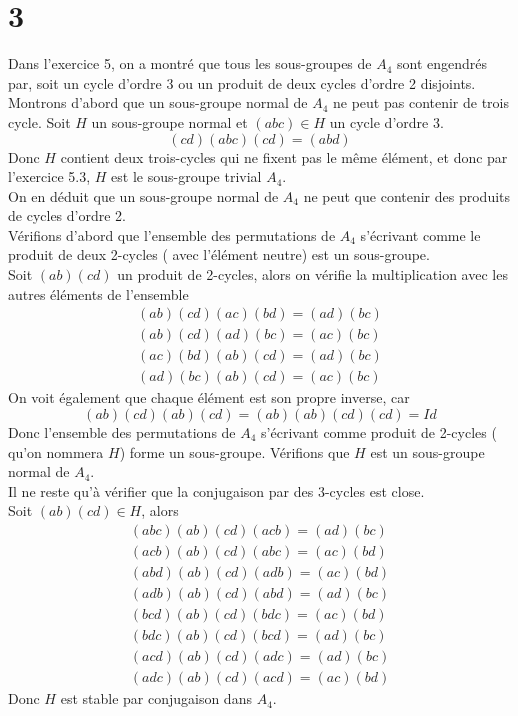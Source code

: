 \documentclass[11pt, a4paper, twoside]{article}
\begin{document}
\section*{3}
Dans l'exercice 5, on a montré que tous les sous-groupes de $A_4$ sont engendrés par, soit un cycle d'ordre 3 ou un produit de deux cycles d'ordre 2 disjoints.\\
Montrons d'abord que un sous-groupe normal de $A_4$ ne peut pas contenir de trois cycle.
Soit $H$ un sous-groupe normal et $( abc)\in H $ un cycle d'ordre 3.
\[ 
	( cd)(abc ) ( cd) = ( abd) 
\]
Donc $H$ contient deux trois-cycles qui ne fixent pas le même élément, et donc par l'exercice 5.3, $H$ est le sous-groupe trivial $A_4$.\\
On en déduit que un sous-groupe normal de $A_4$ ne peut que contenir des produits de cycles d'ordre 2.\\
Vérifions d'abord que l'ensemble des permutations de $A_4$ s'écrivant comme le produit de deux 2-cycles ( avec l'élément neutre)  est un sous-groupe.\\
Soit $( ab) ( cd) $ un produit de 2-cycles, alors on vérifie la multiplication avec les autres éléments de l'ensemble
\begin{align*}
	( ab) ( cd) ( ac) ( bd) = ( ad) ( bc) \\
	( ab) ( cd) ( ad) ( bc) = ( ac) ( bc) \\
	( ac) ( bd) ( ab) ( cd)= ( ad) ( bc) \\
	 ( ad) ( bc) ( ab) ( cd)= ( ac) ( bc)
\end{align*}
On voit également que chaque élément est son propre inverse, car
\[ 
	( ab) ( cd) ( ab) ( cd) = ( ab) ( ab) ( cd) ( cd) = Id
\]
Donc l'ensemble des permutations de $A_4$ s'écrivant comme produit de 2-cycles ( qu'on nommera $H$) forme un sous-groupe.
Vérifions que $H$ est un sous-groupe normal de $A_4$.\\
Il ne reste qu'à vérifier que la conjugaison par des 3-cycles est close.\\
Soit $( ab) ( cd) \in H$, alors
\begin{align*}
	( abc) ( ab) ( cd) ( acb) = ( ad) ( bc)\\
	( acb) ( ab) ( cd) ( abc) = ( ac) ( bd)\\
	( abd) ( ab) ( cd) ( adb) = ( ac) ( bd)\\
	( adb) ( ab) ( cd) ( abd) = ( ad) ( bc)\\
	( bcd) ( ab) ( cd) ( bdc) = ( ac) ( bd)\\
	( bdc) ( ab) ( cd) ( bcd) = ( ad) ( bc)\\
	( acd) ( ab) ( cd) ( adc) = ( ad) ( bc)\\
	( adc) ( ab) ( cd) ( acd) = ( ac) ( bd) 
\end{align*}
Donc $H$ est stable par conjugaison dans $A_4$.
\end{document}
